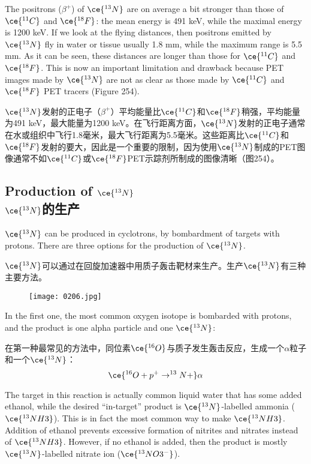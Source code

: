 \documentclass[dvipsnames, svgnames,a4paper,11pt]{article}
\begin{document}
The positrons (\(\beta^+\)) of \(\ce{^{13}N}\) are on average a bit stronger than those of \(\ce{^{11}C}\) and \(\ce{^{18}F}\): the mean energy is 491 keV, while the maximal energy is 1200 keV. If we look at the flying distances, then positrons emitted by \(\ce{^{13}N}\) fly in water or tissue usually 1.8 mm, while the maximum range is 5.5 mm. As it can be seen, these distances are longer than those for \(\ce{^{11}C}\) and \(\ce{^{18}F}\). This is now an important limitation and drawback because PET images made by \(\ce{^{13}N}\) are not as clear as those made by \(\ce{^{11}C}\) and \(\ce{^{18}F}\) PET tracers (Figure 254).

\(\ce{^{13}N}\)发射的正电子（\(\beta^+\)）平均能量比\(\ce{^{11}C}\)和\(\ce{^{18}F}\)稍强，平均能量为491 keV，最大能量为1200 keV。在飞行距离方面，\(\ce{^{13}N}\)发射的正电子通常在水或组织中飞行1.8毫米，最大飞行距离为5.5毫米。这些距离比\(\ce{^{11}C}\)和\(\ce{^{18}F}\)发射的要大，因此是一个重要的限制，因为使用\(\ce{^{13}N}\)制成的PET图像通常不如\(\ce{^{11}C}\)或\(\ce{^{18}F}\)PET示踪剂所制成的图像清晰（图254）。



\subsection{Production of \(\ce{^{13}N}\)\\ \(\ce{^{13}N}\)的生产}  

\(\ce{^{13}N}\) can be produced in cyclotrons, by bombardment of targets with protons. There are three options for the production of \(\ce{^{13}N}\).  

\(\ce{^{13}N}\)可以通过在回旋加速器中用质子轰击靶材来生产。生产\(\ce{^{13}N}\)有三种主要方法。

\begin{figure}[h]
	\centering
    \texttt{[image: 0206.jpg]}  
     \label{fig255}
\end{figure}

In the first one, the most common oxygen isotope is bombarded with protons, and the product is one alpha particle and one \(\ce{^{13}N}\):

在第一种最常见的方法中，同位素\(\ce{^{16}O}\)与质子发生轰击反应，生成一个$\alpha$粒子和一个\(\ce{^{13}N}\)：
\[
\ce{^{16}O + p^+ \to ^{13}N + }\alpha
\]

The target in this reaction is actually common liquid water that has some added ethanol, while the desired “in-target” product is \(\ce{^{13}N}\)-labelled ammonia (\(\ce{^{13}NH3}\)). This is in fact the most common way to make \(\ce{^{13}NH3}\). Addition of ethanol prevents excessive formation of nitrites and nitrates instead of \(\ce{^{13}NH3}\). However, if no ethanol is added, then the product is mostly \(\ce{^{13}N}\)-labelled nitrate ion (\(\ce{^{13}NO3^{-}}\)).
\end{document}
